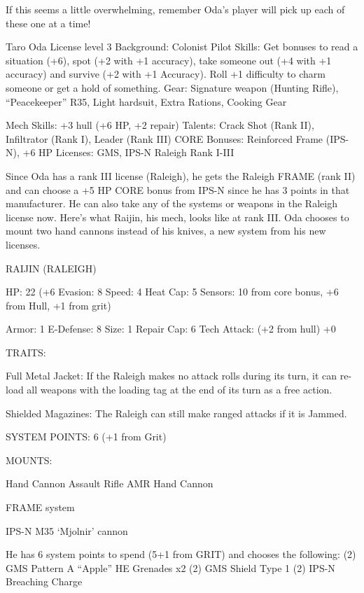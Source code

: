 If this seems a little overwhelming, remember Oda’s player will pick up each of these one at a
time!





Taro Oda
License level 3
Background: Colonist
Pilot Skills: Get bonuses to read a situation (+6), spot (+2 with +1 accuracy), take someone out
(+4 with +1 accuracy) and survive (+2 with +1 Accuracy). Roll +1 difficulty to charm someone or
get a hold of something.
Gear: Signature weapon (Hunting Rifle), “Peacekeeper” R35, Light hardsuit, Extra Rations,
Cooking Gear

Mech Skills: +3 hull (+6 HP, +2 repair)
Talents: Crack Shot (Rank II), Infiltrator (Rank I), Leader (Rank III)
CORE Bonuses: Reinforced Frame (IPS-N),  +6 HP
Licenses: GMS, IPS-N Raleigh Rank I-III

Since Oda has a rank III license (Raleigh), he gets the Raleigh FRAME (rank II) and can choose a
+5 HP CORE bonus from IPS-N since he has 3 points in that manufacturer. He can also take any
of the systems or weapons in the Raleigh license now. Here’s what Raijin, his mech, looks like at
rank III. Oda chooses to mount two hand cannons instead of his knives, a new system from his
new licenses.

                                            RAIJIN (RALEIGH)

 HP: 22 (+6      Evasion: 8                            Speed: 4            Heat Cap: 5        Sensors: 10
 from core
 bonus, +6
 from Hull,
 +1 from grit)

 Armor: 1        E-Defense: 8                          Size: 1             Repair Cap: 6      Tech Attack:
                                                                           (+2 from hull)     +0

                                                    TRAITS:

 Full Metal Jacket: If the Raleigh makes no attack rolls during its turn, it can re-load all weapons with
 the loading tag at the end of its turn as a free action.

 Shielded Magazines: The Raleigh can still make ranged attacks if it is Jammed.

                                     SYSTEM POINTS: 6 (+1 from Grit)

                                                   MOUNTS:

 Hand Cannon
                       Assault Rifle                           AMR
 Hand Cannon

                                                FRAME system




                                          IPS-N M35 ‘Mjolnir’ cannon

He has 6 system points to spend (5+1 from GRIT) and chooses the following:
(2) GMS Pattern A “Apple” HE Grenades x2
(2) GMS Shield Type 1
(2) IPS-N Breaching Charge
